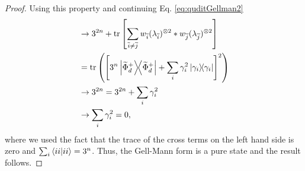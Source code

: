\documentclass[12pt]{iopart}
\begin{document}
\begin{proof}
    Using this property and continuing Eq. \eqref{eq:quditGellman2}
    \begin{align}\label{eq:quditGellman3}
        \notag&\rightarrow 3^{2n} + \tr\left[\sum_{\overline{i}\neq \overline{j}}w_{\overline i}(\lambda_{\overline{i}})^{\otimes 2}*w_{\overline j}(\lambda_{\overline{j}})^{\otimes 2}\right]\\
        \notag&=\tr\left(\left[3^{n}\op{\widetilde\Phi_d^+}+\sum_i\gamma_i^2\op{\gamma_i}\right]^2\right)\\
        \notag&\rightarrow3^{2n}=3^{2n}+\sum_i\gamma_i^2\\
        &\rightarrow\sum_i\gamma_i^2=0,
    \end{align}
    where we used the fact that the trace of the cross terms on the left hand side is zero and $\sum_i\ip{ii}=3^{n}$. Thus, the Gell-Mann form is a pure state and the result follows.
\end{proof}
\end{document}

